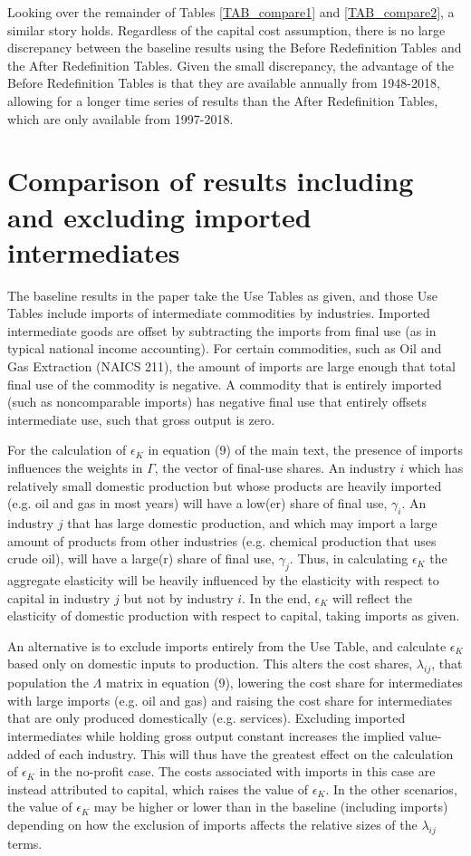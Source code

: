 \documentclass[11pt]{article}
\begin{document}
Looking over the remainder of Tables \ref{TAB_compare1} and \ref{TAB_compare2}, a similar story holds. Regardless of the capital cost assumption, there is no large discrepancy between the baseline results using the Before Redefinition Tables and the After Redefinition Tables. Given the small discrepancy, the advantage of the Before Redefinition Tables is that they are available annually from 1948-2018, allowing for a longer time series of results than the After Redefinition Tables, which are only available from 1997-2018. 

\section{Comparison of results including and excluding imported intermediates}
The baseline results in the paper take the Use Tables as given, and those Use Tables include imports of intermediate commodities by industries. Imported intermediate goods are offset by subtracting the imports from final use (as in typical national income accounting). For certain commodities, such as Oil and Gas Extraction (NAICS 211), the amount of imports are large enough that total final use of the commodity is negative. A commodity that is entirely imported (such as noncomparable imports) has negative final use that entirely offsets intermediate use, such that gross output is zero. 

For the calculation of $\epsilon_K$ in equation (9) of the main text, the presence of imports influences the weights in $\Gamma$, the vector of final-use shares. An industry $i$ which has relatively small domestic production but whose products are heavily imported (e.g. oil and gas in most years) will have a low(er) share of final use, $\gamma_i$. An industry $j$ that has large domestic production, and which may import a large amount of products from other industries (e.g. chemical production that uses crude oil), will have a large(r) share of final use, $\gamma_j$. Thus, in calculating $\epsilon_K$ the aggregate elasticity will be heavily influenced by the elasticity with respect to capital in industry $j$ but not by industry $i$. In the end, $\epsilon_K$ will reflect the elasticity of domestic production with respect to capital, taking imports as given. 

An alternative is to exclude imports entirely from the Use Table, and calculate $\epsilon_K$ based only on domestic inputs to production. This alters the cost shares, $\lambda_{ij}$, that population the $\Lambda$ matrix in equation (9), lowering the cost share for intermediates with large imports (e.g. oil and gas) and raising the cost share for intermediates that are only produced domestically (e.g. services). Excluding imported intermediates while holding gross output constant increases the implied value-added of each industry. This will thus have the greatest effect on the calculation of $\epsilon_K$ in the no-profit case. The costs associated with imports in this case are instead attributed to capital, which raises the value of $\epsilon_K$. In the other scenarios, the value of $\epsilon_K$ may be higher or lower than in the baseline (including imports) depending on how the exclusion of imports affects the relative sizes of the $\lambda_{ij}$ terms. 
\end{document}

